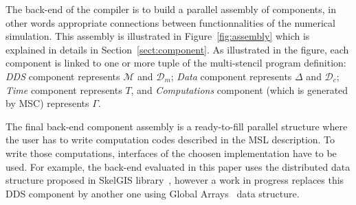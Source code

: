 The back-end of the compiler is to build a parallel assembly of components, in other words appropriate connections between functionnalities of the numerical simulation. This assembly is illustrated in Figure~\ref{fig:assembly} which is explained in details in Section~\ref{sect:component}. As illustrated in the figure, each component is linked to one or more tuple of the multi-stencil program definition: \emph{DDS} component represents $\mathcal{M}$ and $\mathcal{D}_m$; \emph{Data} component represents $\Delta$ and $\mathcal{D}_c$; \emph{Time} component represents $T$, and \emph{Computations} component (which is generated by MSC) represents $\Gamma$.

The final back-end component assembly is a ready-to-fill parallel structure where the user has to write computation codes described in the MSL description. To write those computations, interfaces of the choosen implementation have to be used. For example, the back-end evaluated in this paper uses the distributed data structure proposed in SkelGIS library~\cite{CPE:CPE3494}, however a work in progress replaces this DDS component by another one using Global Arrays~\cite{Nieplocha:2006:AAP:1125980.1125985} data structure.



